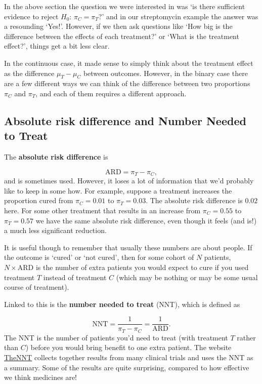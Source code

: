 \documentclass[
  openany]{book}
\theoremstyle{definition}
\theoremstyle{definition}
\theoremstyle{definition}
\theoremstyle{definition}
\theoremstyle{remark}
\begin{document}
In the above section the question we were interested in was `is there sufficient evidence to reject \(H_0:\,\pi_C = \pi_T\)?' and in our streptomycin example the answer was a resounding `Yes!'. However, if we then ask questions like `How big is the difference between the effects of each treatment?' or `What is the treatment effect?', things get a bit less clear.

In the continuous case, it made sense to simply think about the treatment effect as the difference \(\mu_T - \mu_C\) between outcomes. However, in the binary case there are a few different ways we can think of the difference between two proportions \(\pi_C\) and \(\pi_T\), and each of them requires a different approach.

\subsection{Absolute risk difference and Number Needed to Treat}\label{ard-and-nnt}

The \textbf{absolute risk difference} is

\[\text{ARD} = \pi_T - \pi_C,\]
and is sometimes used. However, it loses a lot of information that we'd probably like to keep in some how. For example, suppose a treatment increases the proportion cured from \(\pi_C=0.01\) to \(\pi_T=0.03\). The absolute risk difference is \(0.02\) here. For some other treatment that results in an increase from \(\pi_C=0.55\) to \(\pi_T = 0.57\) we have the same absolute risk difference, even though it feels (and is!) a much less significant reduction.

It is useful though to remember that usually these numbers are about people. If the outcome is `cured' or `not cured', then for some cohort of \(N\) patients, \(N\times\text{ARD}\) is the number of extra patients you would expect to cure if you used treatment \(T\) instead of treatment \(C\) (which may be nothing or may be some usual course of treatment).

Linked to this is the \textbf{number needed to treat} (NNT), which is defined as

\[ \text{NNT} = \frac{1}{\pi_T - \pi_C} = \frac{1}{\text{ARD}}. \]
The NNT is the number of patients you'd need to treat (with treatment \(T\) rather than \(C\)) before you would bring benefit to one extra patient. The website \href{https://thennt.com/}{TheNNT} collects together results from many clinical trials and uses the NNT as a summary. Some of the results are quite surprising, compared to how effective we think medicines are!
\end{document}
